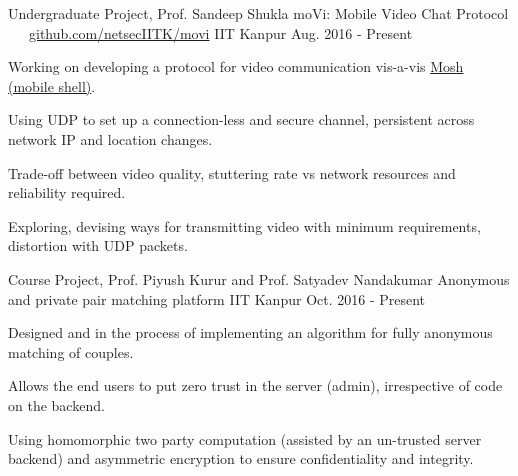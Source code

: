 


\begin{cventries}


  \cventry
  {Undergraduate Project, Prof. Sandeep Shukla}
  {moVi: Mobile Video Chat Protocol
    \ \ \ \normalfont\href{https://github.com/netsecIITK/moVi}
    {github.com/netsecIITK/movi}}
  {IIT Kanpur}
  {Aug. 2016 - Present}
  {
    \begin{cvitems}
    \item Working on developing a protocol for video communication
      vis-a-vis \href{https://mosh.org/}{Mosh (mobile shell)}.
    \item Using UDP to set up a connection-less and secure channel,
      persistent across network IP and location changes.
    \item Trade-off between video quality, stuttering rate vs network
      resources and reliability required.
    \item Exploring, devising ways for transmitting video
      with minimum requirements, distortion with UDP packets.
    \end{cvitems}
  }

  \cventry
  {Course Project, Prof. Piyush Kurur and
    Prof. Satyadev Nandakumar}
  {Anonymous and private pair matching platform}
  {IIT Kanpur}
  {Oct. 2016 - Present}
  {
    \begin{cvitems}
      \item Designed and in the process of implementing an algorithm
        for fully anonymous matching of couples.
      \item Allows the end users to put zero trust in the server
        (admin), irrespective of code on the backend.
      \item Using homomorphic two party computation (assisted by an
        un-trusted server backend) and asymmetric encryption to
        ensure confidentiality and integrity.
    \end{cvitems}
  }


\end{cventries}
